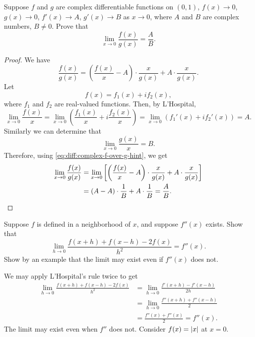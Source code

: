  Suppose $f$ and $g$ are complex differentiable functions
on $(0,1)$, $f(x)\to0$, $g(x)\to0$, $f'(x)\to A$, $g'(x)\to B$ as
$x\to0$, where $A$ and $B$ are complex numbers, $B\neq0$. Prove that
\begin{equation*}
  \lim_{x\to0}\frac{f(x)}{g(x)} = \frac{A}B.
\end{equation*}
\begin{proof}
  We have
  \begin{equation}
    \label{eq:diff:complex-f-over-g-hint}
    \frac{f(x)}{g(x)}
    = \left(\frac{f(x)}x - A\right)\cdot\frac{x}{g(x)}
    + A\cdot\frac{x}{g(x)}.
  \end{equation}
  Let
  \begin{equation*}
    f(x) = f_1(x) + if_2(x),
  \end{equation*}
  where $f_1$ and $f_2$ are real-valued functions. Then, by
  L'Hospital,
  \begin{equation*}
    \lim_{x\to0}\frac{f(x)}x
    = \lim_{x\to0}\left(\frac{f_1(x)}x + i\frac{f_2(x)}x\right)
    = \lim_{x\to0}(f_1'(x) + if_2'(x)) = A.
  \end{equation*}
  Similarly we can determine that
  \begin{equation*}
    \lim_{x\to0}\frac{g(x)}x = B.
  \end{equation*}
  Therefore, using \eqref{eq:diff:complex-f-over-g-hint}, we get
  \begin{align*}
    \lim_{x\to0}\frac{f(x)}{g(x)}
    &= \lim_{x\to0}\left[\left(\frac{f(x)}x - A\right)\cdot\frac{x}{g(x)}
      + A\cdot\frac{x}{g(x)}\right] \\
    &= (A - A)\cdot\frac1B + A\cdot\frac1B = \frac{A}B. \qedhere
  \end{align*}
\end{proof}

 Suppose $f$ is defined in a neighborhood of $x$, and
suppose $f''(x)$ exists. Show that
\begin{equation*}
  \lim_{h\to0}\frac{f(x+h) + f(x-h) - 2f(x)}{h^2} = f''(x).
\end{equation*}
Show by an example that the limit may exist even if $f''(x)$ does not.
\begin{solution}
  We may apply L'Hospital's rule twice to get
  \begin{align*}
    \lim_{h\to0}\frac{f(x+h) + f(x-h) - 2f(x)}{h^2}
    &= \lim_{h\to0}\frac{f'(x+h) - f'(x-h)}{2h} \\
    &= \lim_{h\to0}\frac{f''(x+h) + f''(x-h)}2 \\
    &= \frac{f''(x) + f''(x)}2 = f''(x).
  \end{align*}
  The limit may exist even when $f''$ does not. Consider
  $f(x) = \lvert{x}\rvert$ at $x = 0$.
\end{solution}
